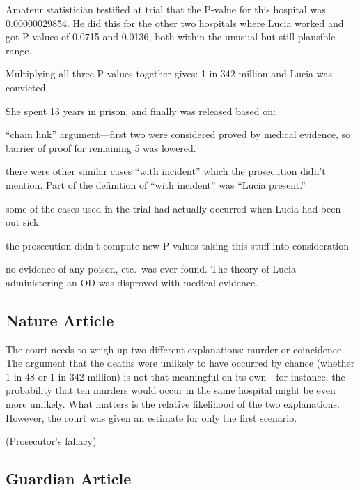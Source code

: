 \documentclass[letterpaper, landscape]{exam}
\begin{document}
  Amateur statistician testified at trial that the P-value for this hospital was
  0.00000029854. He did this for the other two hospitals where Lucia worked and
  got P-values of 0.0715 and 0.0136, both within the unusual but still plausible
  range.

  Multiplying all three P-values together gives: 1 in 342 million and Lucia was
  convicted.

  She spent 13 years in prison, and finally was released based on:
  \begin{itemize*}
    \item ``chain link'' argument---first two were considered proved by medical
      evidence, so barrier of proof for remaining 5 was lowered.

    \item there were other similar cases ``with incident'' which the prosecution
      didn't mention. Part of the definition of ``with incident'' was ``Lucia
      present.''

    \item some of the cases used in the trial had actually occurred when Lucia
      had been out sick.

    \item the prosecution didn't compute new P-values taking this stuff into
      consideration

    \item no evidence of any poison, etc.\ was ever found. The theory of Lucia
      administering an OD was disproved with medical evidence. 
  \end{itemize*}
  
  \subsection{Nature Article} %
  
  The court needs to weigh up two different explanations: murder or
  coincidence. The argument that the deaths were unlikely to have occurred by
  chance (whether 1 in 48 or 1 in 342 million) is not that meaningful on its
  own---for instance, the probability that ten murders would occur in the same
  hospital might be even more unlikely. What matters is the relative
  likelihood of the two explanations. However, the court was given an estimate
  for only the first scenario.

  (Prosecutor's fallacy)

  \subsection{Guardian Article} %
\end{document}
